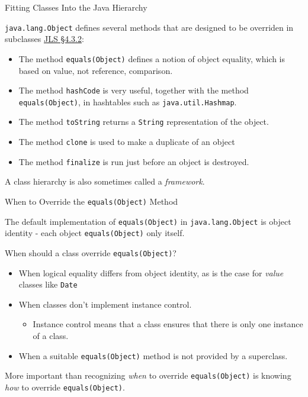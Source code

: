 \documentclass{beamer}
\author[Chris Simpkins] 
{Christopher Simpkins \\\texttt{chris.simpkins@gatech.edu}}
\institute[Georgia Tech] %
\date[CS 1331]{}
\begin{document}
\begin{frame}
  \titlepage
\end{frame}



\begin{frame}[fragile]{Fitting Classes Into the Java Hierarchy}


{\tt java.lang.Object} defines several methods that are designed to be overriden in subclasses \href{http://docs.oracle.com/javase/specs/jls/se7/html/jls-4.html#jls-4.3.2}{JLS \S 4.3.2}: 
\begin{itemize}
\item The method {\tt equals(Object)} defines a notion of object equality, which is based on value, not reference, comparison.
\item The method {\tt hashCode} is very useful, together with the method {\tt equals(Object)}, in hashtables such as {\tt java.util.Hashmap}.
\item The method {\tt toString} returns a {\tt String} representation of the object.
\item The method {\tt clone} is used to make a duplicate of an object
\item The method {\tt finalize} is run just before an object is destroyed.
\end{itemize}

A class hierarchy is also sometimes called a {\it framework}.

\end{frame}


\begin{frame}[fragile]{When to Override the {\tt equals(Object)} Method}


The default implementation of {\tt equals(Object)} in {\tt java.lang.Object} is object identity - each object {\tt equals(Object)} only itself.

When should a class override {\tt equals(Object)}?
\begin{itemize}
\item When logical equality differs from object identity, as is the case for {\it value} classes like {\tt Date}
\item When classes don't implement instance control.
  \begin{itemize}
  \item Instance control means that a class ensures that there is only one instance of a class.  
  \end{itemize}
\item When a suitable {\tt equals(Object)} method is not provided by a superclass.
\end{itemize}

More important than recognizing {\it when} to override {\tt equals(Object)} is knowing {\it how} to override {\tt equals(Object)}.
\end{frame}
\end{document}
